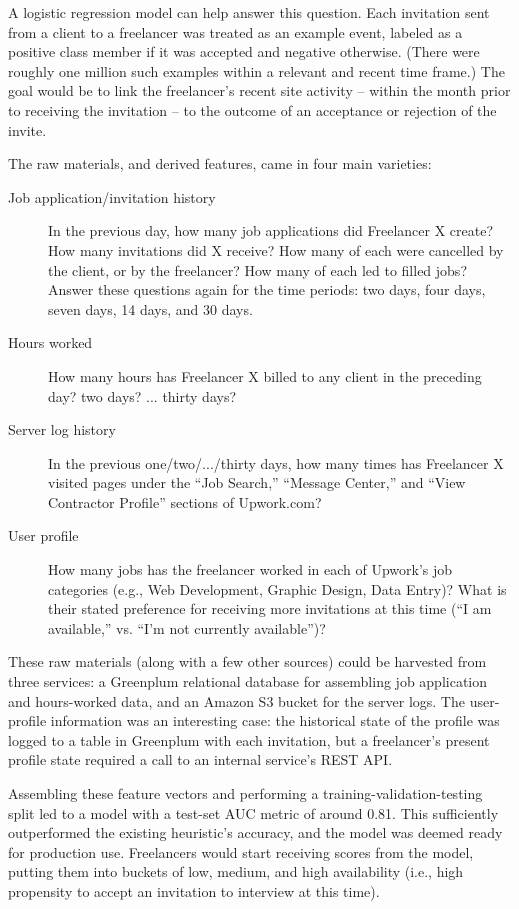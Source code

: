 \documentclass[tablecaption=bottom,wcp]{jmlr}
\begin{document}
 A logistic regression model can help answer this question. Each invitation sent
from a client to a freelancer was treated as an example event, labeled as a
positive class member if it was accepted and negative otherwise. (There were
roughly one million such examples within a relevant and recent time frame.) The
goal would be to link the freelancer's recent site activity -- within the month
prior to receiving the invitation -- to the outcome of an acceptance or
rejection of the invite.

The raw materials, and derived features, came in four main varieties:

\begin{description}
 \item[Job application/invitation history] In the previous day, how many job
applications did Freelancer X create? How many invitations did X receive? How
many of each were cancelled by the client, or by the freelancer? How many of
each led to filled jobs? Answer these questions again for the time periods: two
days, four days, seven days, 14 days, and 30 days.
 \item[Hours worked] How many hours has Freelancer X billed to any client in the
preceding day? two days? ... thirty days?
 \item[Server log history] In the previous one/two/.../thirty days, how many
times has Freelancer X visited pages under the ``Job Search,'' ``Message
Center,'' and ``View Contractor Profile'' sections of Upwork.com?
 \item[User profile] How many jobs has the freelancer worked in each of Upwork's
job categories (e.g., Web Development, Graphic Design, Data Entry)? What is
their stated preference for receiving more invitations at this time (``I am
available,'' vs. ``I'm not currently available'')?
\end{description}

 These raw materials (along with a few other sources) could be harvested from
three services: a Greenplum relational database for assembling job application
and hours-worked data, and an Amazon S3 bucket for the server logs. The
user-profile information was an interesting case: the historical state of the
profile was logged to a table in Greenplum with each invitation, but a
freelancer's present profile state required a call to an internal service's REST
API.

 Assembling these feature vectors and performing a training-validation-testing
split led to a model with a test-set AUC metric of around 0.81. This
sufficiently outperformed the existing heuristic's accuracy, and the model was
deemed ready for production use. Freelancers would start receiving scores from
the model, putting them into buckets of low, medium, and high availability
(i.e., high propensity to accept an invitation to interview at this time).
\end{document}
